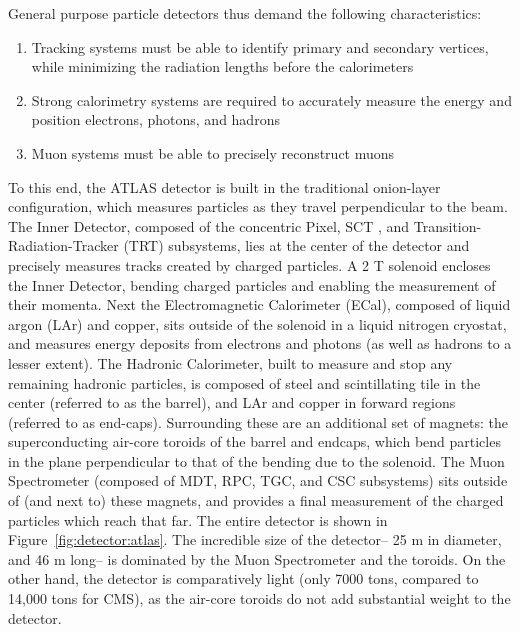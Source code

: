 
General purpose particle detectors thus demand the following characteristics: 

\begin{enumerate}
	\item Tracking systems must be able to identify primary and secondary vertices, while minimizing the radiation lengths before the calorimeters
	\item Strong calorimetry systems are required to accurately measure the energy and position electrons, photons, and hadrons
	\item Muon systems must be able to precisely reconstruct muons
\end{enumerate}

To this end, the ATLAS detector is built in the traditional onion-layer configuration, which measures particles as they travel perpendicular to the beam. The Inner Detector, composed of the concentric Pixel, SCT , and Transition-Radiation-Tracker (TRT) subsystems, lies at the center of the detector and precisely measures tracks created by charged particles. A 2 T solenoid encloses the Inner Detector, bending charged particles and enabling the measurement of their momenta. Next the Electromagnetic Calorimeter (ECal), composed of liquid argon (LAr) and copper, sits outside of the solenoid in a liquid nitrogen cryostat, and measures energy deposits from electrons and photons (as well as hadrons to a lesser extent). The Hadronic Calorimeter, built to measure and stop any remaining hadronic particles, is composed of steel and scintillating tile in the center (referred to as the barrel), and LAr and copper in forward regions (referred to as end-caps). Surrounding these are an additional set of magnets: the superconducting air-core toroids of the barrel and endcaps, which bend particles in the plane perpendicular to that of the bending due to the solenoid.  The Muon Spectrometer (composed of MDT, RPC, TGC, and CSC subsystems) sits outside of (and next to) these magnets, and provides a final measurement of the charged particles which reach that far. The entire detector is shown in Figure~\ref{fig:detector:atlas}. The incredible size of the detector-- 25 m in diameter, and 46 m long-- is dominated by the Muon Spectrometer and the toroids. On the other hand, the detector is comparatively light (only 7000 tons, compared to 14,000 tons for CMS), as the air-core toroids do not add substantial weight to the detector. 


